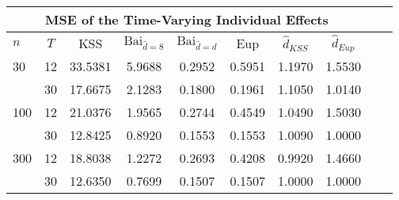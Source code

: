 \begin{tabular}{lccccccccc} 
\hline \multicolumn{8}{c}{MSE of the Time-Varying Individual Effects} \\ \hline 
$n$ & $T$ & KSS & $ \text{Bai}_{\hat{d} = 8}$ & $\text{Bai}_{\hat{d} = d}$ & Eup & $\hat{d}_{KSS}$ & $\hat{d}_{Eup}$ \\
\hline
30 & 12 &  33.5381  &  5.9688  &  0.2952  &  0.5951  &  1.1970  &  1.5530  \\
& 30 &  17.6675  &  2.1283  &  0.1800  &  0.1961  &  1.1050  &  1.0140  \\
100 & 12 &  21.0376  &  1.9565  &  0.2744  &  0.4549  &  1.0490  &  1.5030  \\
& 30 &  12.8425  &  0.8920  &  0.1553  &  0.1553  &  1.0090  &  1.0000  \\
300 & 12 &  18.8038  &  1.2272  &  0.2693  &  0.4208  &  0.9920  &  1.4660  \\
& 30 &  12.6350  &  0.7699  &  0.1507  &  0.1507  &  1.0000  &  1.0000  \\
\end{tabular} 
